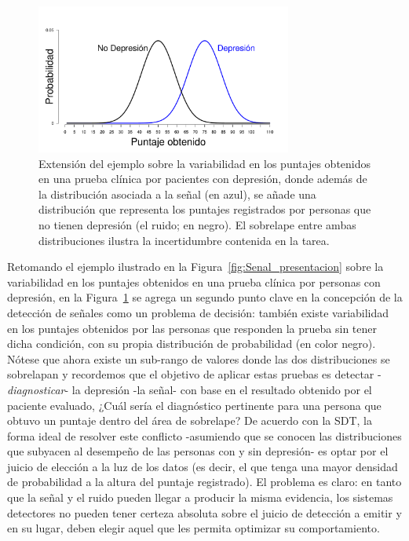 \begin{figure}[h]
\centering
\includegraphics[width=0.75\textwidth]{Figures/Noise} 
\decoRule
\caption[Variabilidad en la señal y en el ruido]{Extensión del ejemplo sobre la variabilidad en los puntajes obtenidos en una prueba clínica por pacientes con depresión, donde además de la distribución asociada a la señal (en azul), se añade una distribución que representa los puntajes registrados por personas que no tienen depresión (el ruido; en negro). El sobrelape entre ambas distribuciones ilustra la incertidumbre contenida en la tarea.}
\label{fig:Noise}
\end{figure}

Retomando el ejemplo ilustrado en la Figura~\ref{fig:Senal_presentacion} sobre la variabilidad en los puntajes obtenidos en una prueba clínica por personas con depresión, en la Figura~\ref{fig:Noise} se agrega un segundo punto clave en la concepción de la detección de señales como un problema de decisión: también existe variabilidad en los puntajes obtenidos por las personas que responden la prueba sin tener dicha condición, con su propia distribución de probabilidad (en color negro). Nótese que ahora existe un sub-rango de valores donde las dos distribuciones se sobrelapan y recordemos que el objetivo de aplicar estas pruebas es detectar -\textit{diagnosticar}- la depresión -la señal- con base en el resultado obtenido por el paciente evaluado, ¿Cuál sería el diagnóstico pertinente para una persona que obtuvo un puntaje dentro del área de sobrelape? De acuerdo con la SDT, la forma ideal de resolver este conflicto -asumiendo que se conocen las distribuciones que subyacen al desempeño de las personas con y sin depresión- es optar por el juicio de elección  a la luz de los datos (es decir, el que tenga una mayor densidad de probabilidad a la altura del puntaje registrado). El problema es claro: en tanto que la señal y el ruido pueden llegar a producir la misma evidencia, los sistemas detectores no pueden tener certeza absoluta sobre el juicio de detección a emitir y en su lugar, deben elegir aquel que les permita optimizar su comportamiento.\\ 


